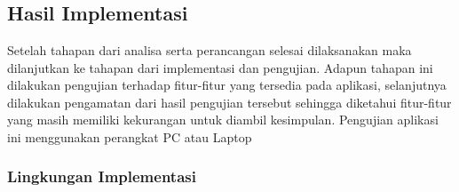%
%
%
%

\chapter{\babLima}

\section{Hasil Implementasi}
Setelah tahapan dari analisa serta perancangan selesai dilaksanakan maka dilanjutkan ke tahapan dari implementasi dan pengujian. 
Adapun tahapan ini dilakukan pengujian terhadap ﬁtur-ﬁtur yang tersedia pada aplikasi, selanjutnya dilakukan pengamatan dari hasil pengujian tersebut sehingga diketahui ﬁtur-ﬁtur yang masih memiliki kekurangan untuk diambil kesimpulan. Pengujian aplikasi ini menggunakan perangkat PC atau Laptop


\subsection{Lingkungan Implementasi}

